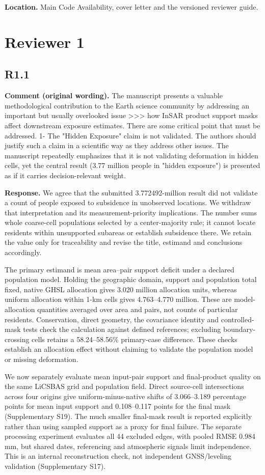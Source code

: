 \documentclass[11pt,a4paper]{article}
\begin{document}
\textbf{Location.} Main Code Availability, cover letter and the versioned reviewer guide.

\section*{Reviewer 1}

\subsection*{R1.1}

\textbf{Comment (original wording).} The manuscript presents a valuable methodological contribution to the Earth science community by addressing an important but usually overlooked issue >>> how InSAR product support masks affect downstream exposure estimates.
There are some critical point that must be addressed.
1- The "Hidden Exposure" claim is not validated. The authors should justify such a claim in a scientific way as they address other issues.
The manuscript repeatedly emphasizes that it is not validating deformation in hidden cells, yet the central result (3.77 million people in "hidden exposure") is presented as if it carries decision-relevant weight.

\textbf{Response.} We agree that the submitted 3.772492-million result did not validate a count of people exposed to subsidence in unobserved locations. We withdraw that interpretation and its measurement-priority implications. The number sums whole coarse-cell populations selected by a center-majority rule; it cannot locate residents within unsupported subareas or establish subsidence there. We retain the value only for traceability and revise the title, estimand and conclusions accordingly.

The primary estimand is mean area--pair support deficit under a declared population model. Holding the geographic domain, support and population total fixed, native GHSL allocation gives 3.020 million allocation units, whereas uniform allocation within 1-km cells gives 4.763--4.770 million. These are model-allocation quantities averaged over area and pairs, not counts of particular residents. Conservation, direct geometry, the covariance identity and controlled-mask tests check the calculation against defined references; excluding boundary-crossing cells retains a 58.24--58.56\% primary-case difference. These checks establish an allocation effect without claiming to validate the population model or missing deformation.

We now separately evaluate mean input-pair support and final-product quality on the same LiCSBAS grid and population field. Direct source-cell intersections across four origins give uniform-minus-native shifts of 3.066--3.189 percentage points for mean input support and 0.108--0.117 points for the final mask (Supplementary S19). The much smaller final-mask result is reported explicitly rather than using sampled support as a proxy for final failure. The separate processing experiment evaluates all 44 excluded edges, with pooled RMSE 0.984 mm, but shared dates, referencing and atmospheric signals limit independence. This is an internal reconstruction check, not independent GNSS/leveling validation (Supplementary S17).
\end{document}
